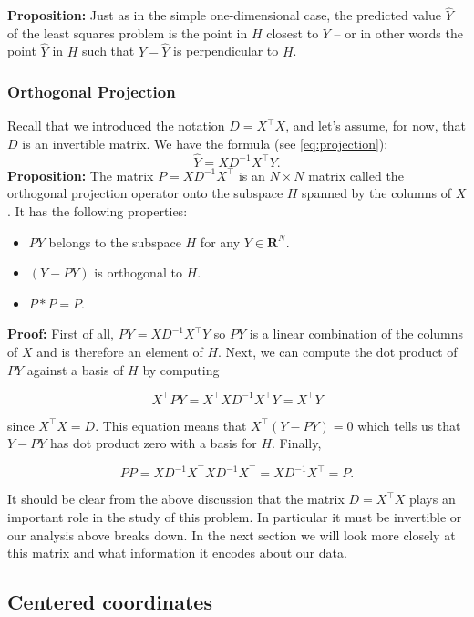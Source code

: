 \documentclass[
]{article}
\providecommand{\tightlist}{%
  \setlength{\itemsep}{0pt}\setlength{\parskip}{0pt}}
\begin{document}
\textbf{Proposition:} Just as in the simple one-dimensional case, the
predicted value \(\hat{Y}\) of the least squares problem is the point in
\(H\) closest to \(Y\) -- or in other words the point \(\hat{Y}\) in
\(H\) such that \(Y-\hat{Y}\) is perpendicular to \(H\).

\hypertarget{orthogonal-projection}{%
\subsubsection{Orthogonal Projection}\label{orthogonal-projection}}

Recall that we introduced the notation \(D=X^{\intercal}X\), and let's
assume, for now, that \(D\) is an invertible matrix. We have the formula
(see \cref{eq:projection}): \[ \hat{Y} = XD^{-1}X^{\intercal}Y.  \]
\textbf{Proposition:} The matrix \(P=XD^{-1}X^{\intercal}\) is an
\(N\times N\) matrix called the orthogonal projection operator onto the
subspace \(H\) spanned by the columns of \(X\). It has the following
properties:

\begin{itemize}
\tightlist
\item
  \(PY\) belongs to the subspace \(H\) for any \(Y\in\mathbf{R}^{N}\).
\item
  \((Y-PY)\) is orthogonal to \(H\).
\item
  \(P*P = P\).
\end{itemize}

\textbf{Proof:} First of all, \(PY=XD^{-1}X^{\intercal}Y\) so \(PY\) is
a linear combination of the columns of \(X\) and is therefore an element
of \(H\). Next, we can compute the dot product of \(PY\) against a basis
of \(H\) by computing

\[ X^{\intercal}PY = X^{\intercal}XD^{-1}X^{\intercal}Y =
X^{\intercal}Y \]

since \(X^{\intercal}X=D\). This equation means that
\(X^{\intercal}(Y-PY)=0\) which tells us that \(Y-PY\) has dot product
zero with a basis for \(H\). Finally,

\[ PP = XD^{-1}X^{\intercal}XD^{-1}X^{\intercal} =
XD^{-1}X^{\intercal}=P.  \]

It should be clear from the above discussion that the matrix
\(D=X^{\intercal}X\) plays an important role in the study of this
problem. In particular it must be invertible or our analysis above
breaks down. In the next section we will look more closely at this
matrix and what information it encodes about our data.

\hypertarget{sec:centered}{%
\subsection{Centered coordinates}\label{sec:centered}}
\end{document}
